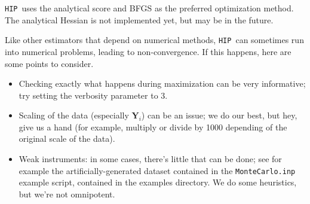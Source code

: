 \documentclass[a4paper,10pt]{article}
\newcommand{\app}[1]{\textsf{#1}}
\newcounter{script}[section]
\newcommand{\HIP}{\texttt{HIP}}
\newcommand{\Endog}{\mathbf{Y}_{i}}
\begin{document}
\HIP\ uses the analytical score and BFGS as the preferred optimization
method. The analytical Hessian is not implemented yet, but may be in
the future.

Like other estimators that depend on numerical methods, \HIP\ can
sometimes run into numerical problems, leading to non-convergence. 
If this happens, here are some points to consider.

\begin{itemize}
\item Checking exactly what happens during maximization can be very
  informative; try setting the verbosity parameter to 3.
\item Scaling of the data (especially $\Endog$) can be an issue; we do
  our best, but hey, give us a hand (for example, multiply or divide
  by 1000 depending of the original scale of the data).
\item Weak instruments: in some cases, there's little that can be
  done; see for example the artificially-generated dataset contained
  in the \texttt{MonteCarlo.inp} example script, contained in the
  examples directory. We do some heuristics, but we're not omnipotent.
\end{itemize}



\clearpage
\appendix



\end{document}
